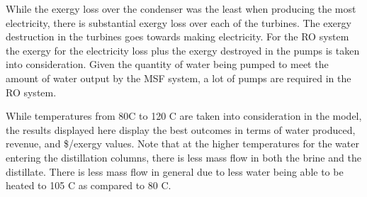 \documentclass[12pt]{UIdahoMastersThesis}
\begin{document}
While the exergy loss over the condenser was the least when producing the most electricity, there is substantial exergy loss over each of the turbines.  The exergy destruction in the turbines goes towards making electricity. For the RO system the exergy for the electricity loss plus the exergy destroyed in the pumps is taken into consideration.  Given the quantity of water being pumped to meet the amount of water output by the MSF system, a lot of pumps are required in the RO system.


While temperatures from 80\degree C to 120 \degree C are taken into consideration in the model, the results displayed here display the best outcomes in terms of water produced, revenue, and \$/exergy values. Note that at the higher temperatures for the water entering the distillation columns, there is less mass flow in both the brine and the distillate.  There is less mass flow in general due to less water being able to be heated to 105 \degree C as compared to 80 \degree C.
\end{document}
